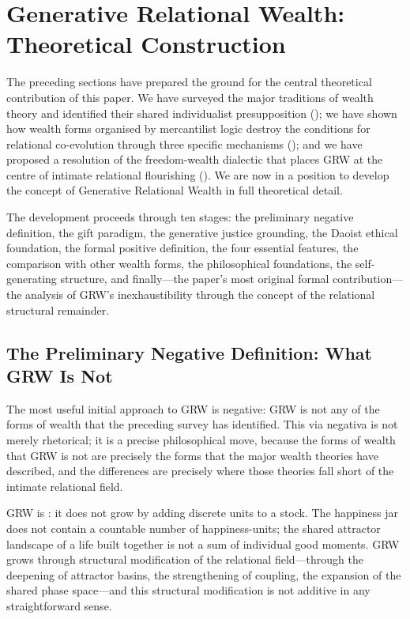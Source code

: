 \section{Generative Relational Wealth: Theoretical Construction}
\label{p15:sec:grw}

\noindent
The preceding sections have prepared the ground for the central theoretical contribution of this paper. We have surveyed the major traditions of wealth theory and identified their shared individualist presupposition (); we have shown how wealth forms organised by mercantilist logic destroy the conditions for relational co-evolution through three specific mechanisms (); and we have proposed a resolution of the freedom-wealth dialectic that places GRW at the centre of intimate relational flourishing (). We are now in a position to develop the concept of Generative Relational Wealth in full theoretical detail.

The development proceeds through ten stages: the preliminary negative definition, the gift paradigm, the generative justice grounding, the Daoist ethical foundation, the formal positive definition, the four essential features, the comparison with other wealth forms, the philosophical foundations, the self-generating structure, and finally---the paper's most original formal contribution---the analysis of GRW's inexhaustibility through the concept of the relational structural remainder.

\subsection{The Preliminary Negative Definition: What GRW Is Not}
\label{p15:subsec:negative}

\noindent
The most useful initial approach to GRW is negative: GRW is not any of the forms of wealth that the preceding survey has identified. This via negativa is not merely rhetorical; it is a precise philosophical move, because the forms of wealth that GRW is not are precisely the forms that the major wealth theories have described, and the differences are precisely where those theories fall short of the intimate relational field.

GRW is : it does not grow by adding discrete units to a stock. The happiness jar does not contain a countable number of happiness-units; the shared attractor landscape of a life built together is not a sum of individual good moments. GRW grows through structural modification of the relational field---through the deepening of attractor basins, the strengthening of coupling, the expansion of the shared phase space---and this structural modification is not additive in any straightforward sense.

